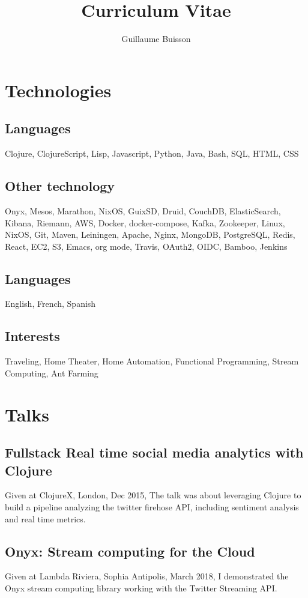 \documentclass{article}
\title{Curriculum Vitae}
\author{Guillaume Buisson}
\date{}
\begin{document}
\maketitle
\section*{Technologies}
\subsection*{Languages}
Clojure, ClojureScript, Lisp, Javascript, Python, Java, Bash, SQL, HTML, CSS

\subsection*{Other technology}
Onyx, Mesos, Marathon, NixOS, GuixSD, Druid, CouchDB, ElasticSearch, Kibana, Riemann, AWS, Docker, docker-compose, Kafka, Zookeeper, Linux, NixOS, Git, Maven, Leiningen, Apache, Nginx, MongoDB, PostgreSQL, Redis, React, EC2, S3, Emacs, org mode, Travis, OAuth2, OIDC, Bamboo, Jenkins

\subsection*{Languages}
English, French, Spanish

\subsection*{Interests}
Traveling, Home Theater, Home Automation, Functional Programming, Stream Computing, Ant Farming

\section*{Talks}
\subsection*{Fullstack Real time social media analytics with Clojure}
Given at ClojureX, London, Dec 2015, The talk was about
leveraging Clojure to build a pipeline analyzing the twitter firehose API,
including sentiment analysis and real time metrics.

\subsection*{Onyx: Stream computing for the Cloud}
Given at Lambda Riviera, Sophia Antipolis, March 2018, I demonstrated the Onyx stream computing
library working with the Twitter Streaming API.
\end{document}
